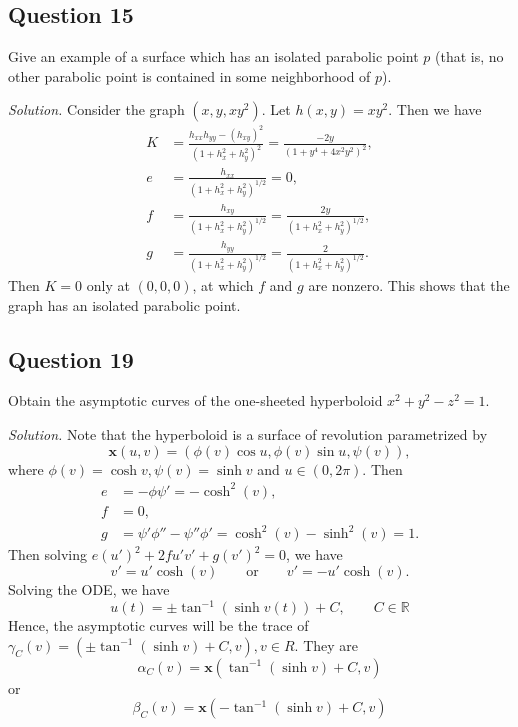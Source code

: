 \documentclass[12pt]{article}
\begin{document}
\subsection*{Question 15}
Give an example of a surface which has an isolated parabolic point $p$ (that is, no other parabolic point is contained in some neighborhood of $p$).

\textit{Solution.} Consider the graph $(x,y,xy^2)$. Let $h(x,y)=xy^2$. Then we have\begin{align*}
    K &= \frac{h_{xx}h_{yy}-(h_{xy})^2}{(1+h_x^2+h_y^2)^2} = \frac{-2y}{(1+y^4+4x^2y^2)^2},\\
    e &= \frac{h_{xx}}{(1+h_x^2+h_y^2)^{1/2}}=0,\\
    f &= \frac{h_{xy}}{(1+h_x^2+h_y^2)^{1/2}}=\frac{2y}{(1+h_x^2+h_y^2)^{1/2}},\\
    g &= \frac{h_{yy}}{(1+h_x^2+h_y^2)^{1/2}}=\frac{2}{(1+h_x^2+h_y^2)^{1/2}}.
\end{align*}
 Then $K=0$ only at $(0,0,0)$, at which $f$ and $g$ are nonzero. This shows that the graph has an isolated parabolic point.
 
\subsection*{Question 19}
Obtain the asymptotic curves of the one-sheeted hyperboloid $x^2 + y^2 - z^2 = 1$.

\textit{Solution.} Note that the hyperboloid is a surface of revolution parametrized by \begin{equation*}
    \mathbf{x}(u,v) = (\phi(v)\cos{u},\phi(v)\sin{u},\psi(v)),
\end{equation*}
where $\phi(v) = \cosh{v},\psi(v)=\sinh{v}$ and $u\in(0,2\pi)$. Then\begin{align*}
    e &=  -\phi\psi'=-\cosh^2(v),\\
    f &= 0,\\
    g &= \psi'\phi''-\psi''\phi'=\cosh^2(v)-\sinh^2(v)=1.
\end{align*}
Then solving $e(u')^2 +2fu'v'+g(v')^2=0$, we have \begin{equation*}
    v'=u'\cosh(v) \qquad \text{or} \qquad v'=-u'\cosh(v).
\end{equation*}
Solving the ODE, we have \begin{equation*}
    u(t) = \pm \tan^{-1}(\sinh v(t)) + C,\qquad C\in \mathbb{R}
\end{equation*}
Hence, the asymptotic curves will be the trace of $\gamma_C(v) = (\pm\tan^{-1}( \sinh v)  + C,v), v\in R$. They are \begin{equation*}
    \alpha_C(v) = \mathbf{x}(\tan^{-1}( \sinh v)  + C,v)
\end{equation*} or \begin{equation*}
    \beta_C(v) = \mathbf{x}(-\tan^{-1}( \sinh v)  + C,v)
\end{equation*}
\end{document}
